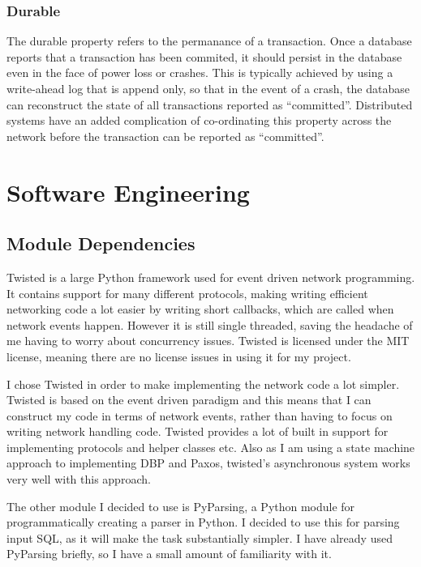 \documentclass[12pt,twoside,notitlepage]{report}
\begin{document}
\subsubsection*{Durable}

The durable property refers to the permanance of a transaction. Once a database reports that a
transaction has been commited, it should persist in the database even in the face of power loss or
crashes. This is typically achieved by using a write-ahead log that is append only, so that in the
event of a crash, the database can reconstruct the state of all transactions reported as
``committed''. Distributed systems have an added complication of co-ordinating this property
across the network before the transaction can be reported as ``committed''.

\section{Software Engineering}

\subsection{Module Dependencies}

Twisted is a large Python framework used for event driven network programming. It contains support
for many different protocols, making writing efficient networking code a lot easier by writing
short callbacks, which are called when network events happen. However it is still single threaded,
saving the headache of me having to worry about concurrency issues. Twisted is licensed under the
MIT license, meaning there are no license issues in using it for my project.

I chose Twisted in order to make implementing the network code a lot simpler. Twisted is based on
the event driven paradigm and this means that I can construct my code in terms of network events,
rather than having to focus on writing network handling code. Twisted provides a lot of built in
support for implementing protocols and helper classes etc. Also as I am using a state machine
approach to implementing DBP and Paxos, twisted's asynchronous system works very well with this
approach.

The other module I decided to use is PyParsing, a Python module for programmatically creating a
parser in Python. I decided to use this for parsing input SQL, as it will make the task
substantially simpler. I have already used PyParsing briefly, so I have a small amount of
familiarity with it.
\end{document}
